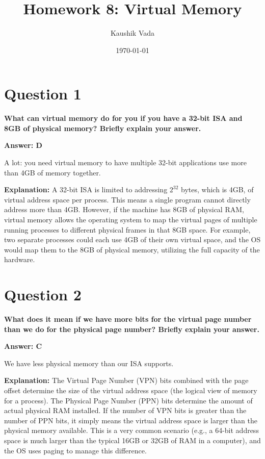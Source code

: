 \documentclass[12pt]{article}
\title{\textbf{Homework 8: Virtual Memory}}
\author{Kaushik Vada}
\date{\today}
\begin{document}
\maketitle

\section*{Question 1}
\textbf{What can virtual memory do for you if you have a 32-bit ISA and 8GB of physical memory? Briefly explain your answer.}

\textbf{Answer: D}

\noindent A lot: you need virtual memory to have multiple 32-bit applications use more than 4GB of memory together.

\noindent \textbf{Explanation:} 
A 32-bit ISA is limited to addressing $2^{32}$ bytes, which is 4GB, of virtual address space per process. This means a single program cannot directly address more than 4GB. However, if the machine has 8GB of physical RAM, virtual memory allows the operating system to map the virtual pages of multiple running processes to different physical frames in that 8GB space. For example, two separate processes could each use 4GB of their own virtual space, and the OS would map them to the 8GB of physical memory, utilizing the full capacity of the hardware.

\vspace{0.5cm}

\section*{Question 2}
\textbf{What does it mean if we have more bits for the virtual page number than we do for the physical page number? Briefly explain your answer.}

\textbf{Answer: C}

\noindent We have less physical memory than our ISA supports.

\noindent \textbf{Explanation:} 
The Virtual Page Number (VPN) bits combined with the page offset determine the size of the virtual address space (the logical view of memory for a process). The Physical Page Number (PPN) bits determine the amount of actual physical RAM installed. If the number of VPN bits is greater than the number of PPN bits, it simply means the virtual address space is larger than the physical memory available. This is a very common scenario (e.g., a 64-bit address space is much larger than the typical 16GB or 32GB of RAM in a computer), and the OS uses paging to manage this difference.
\end{document}
